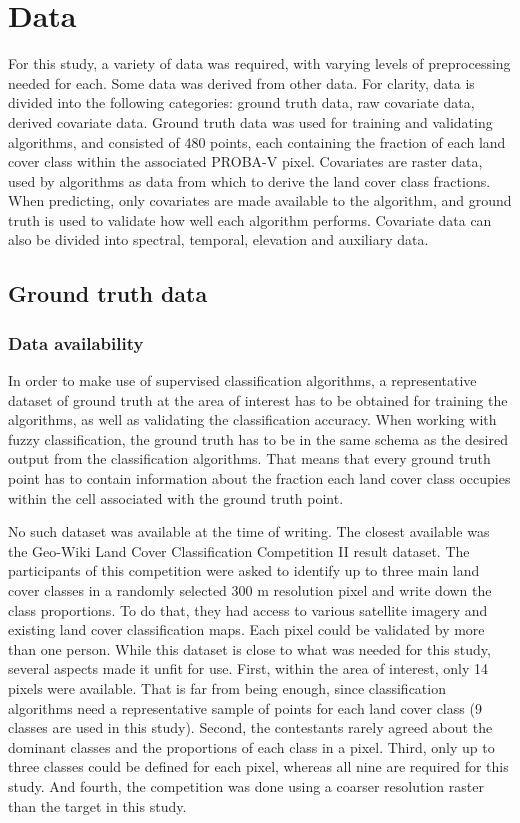 \documentclass[a4paper,10pt]{book}
\begin{document}
\section{Data}

For this study, a variety of data was required, with varying levels of preprocessing needed for each. Some data was derived from other data. For clarity, data is divided into the following categories: ground truth data, raw covariate data, derived covariate data. Ground truth data was used for training and validating algorithms, and consisted of 480 points, each containing the fraction of each land cover class within the associated PROBA-V pixel. Covariates are raster data, used by algorithms as data from which to derive the land cover class fractions. When predicting, only covariates are made available to the algorithm, and ground truth is used to validate how well each algorithm performs. Covariate data can also be divided into spectral, temporal, elevation and auxiliary data.

\subsection{Ground truth data}

\subsubsection{Data availability}

In order to make use of supervised classification algorithms, a representative dataset of ground truth at the area of interest has to be obtained for training the algorithms, as well as validating the classification accuracy. When working with fuzzy classification, the ground truth has to be in the same schema as the desired output from the classification algorithms. That means that every ground truth point has to contain information about the fraction each land cover class occupies within the cell associated with the ground truth point.

No such dataset was available at the time of writing. The closest available was the Geo-Wiki Land Cover Classification Competition II result dataset. The participants of this competition were asked to identify up to three main land cover classes in a randomly selected 300 m resolution pixel and write down the class proportions. To do that, they had access to various satellite imagery and existing land cover classification maps. Each pixel could be validated by more than one person. While this dataset is close to what was needed for this study, several aspects made it unfit for use. First, within the area of interest, only 14 pixels were available. That is far from being enough, since classification algorithms need a representative sample of points for each land cover class (9 classes are used in this study). Second, the contestants rarely agreed about the dominant classes and the proportions of each class in a pixel. Third, only up to three classes could be defined for each pixel, whereas all nine are required for this study. And fourth, the competition was done using a coarser resolution raster than the target in this study.
\end{document}
